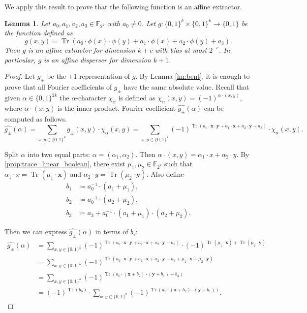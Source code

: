 \documentclass[10pt,a4paper]{article}
\newtheorem{lemma}[theorem]{Lemma}
\theoremstyle{definition}
\theoremstyle{remark}
\DeclareMathOperator{\Tr}{Tr}
\newcommand{\iso}[1]{\mathbf{#1}}
\newcommand{\Q}{{\{0,1\}}}
\newcommand{\bbF}{\mathbb{F}}
\begin{document}
We apply this result to prove that the following function is an affine extractor.
\begin{lemma}\label{lem:trace_affine_extractor}
  Let $a_0, a_1, a_2, a_3 \in \bbF_{2^k}$ with $a_0 \ne 0$. Let $g\colon \Q^k \times \Q^k \to \Q$ be the function defined as
  \[
    g(x, y) = \Tr(a_0 \cdot \phi(x) \cdot \phi(y) + a_1 \cdot \phi(x) + a_2 \cdot \phi(y) + a_3).
  \]
  Then $g$ is an affine extractor for dimension $k+c$ with bias at most $2^{-c}$.
  In particular, $g$ is an affine disperser for dimension $k+1$.
\end{lemma}
\begin{proof}
  Let $g_\pm$ be the $\pm 1$ representation of $g$. By Lemma \ref{lm:bent}, it is enough to prove that all Fourier coefficients of $g_\pm$ have the same absolute value. Recall that given $\alpha \in \Q^{2k}$ the $\alpha$-character $\chi_\alpha$ is defined as $\chi_\alpha(x, y) = {(-1)}^{\alpha \cdot (x, y)}$, where $\alpha \cdot (x, y)$ is the inner product. Fourier coefficient $\widehat{g_\pm}(\alpha)$ can be computed as follows.
  \[
    \widehat{g_\pm}(\alpha) = \sum_{x,y \in \Q^k} g_\pm(x, y) \cdot \chi_\alpha(x, y) = \sum_{x,y \in \Q^k} {(-1)}^{\Tr(a_0 \cdot \iso{x} \cdot \iso{y} + a_1 \cdot \iso{x} + a_2 \cdot \iso{y} + a_3)} \cdot \chi_\alpha(x, y).
  \]

    Split $\alpha$ into two equal parts: $\alpha = (\alpha_1, \alpha_2)$. Then $\alpha \cdot (x, y) = \alpha_1 \cdot x + \alpha_2 \cdot y$.
  By \cref{prop:trace_linear_boolean}, there exist $\mu_1, \mu_2 \in \bbF_{2^k}$ such that $\alpha_1 \cdot x = \Tr(\mu_1 \cdot \iso{x})$ and $\alpha_2 \cdot y = \Tr(\mu_2 \cdot \iso{y})$. Also define
  \begin{align*}
    b_1 &\coloneqq a_0^{-1} \cdot (a_1 + \mu_1), \\
    b_2 &\coloneqq a_0^{-1} \cdot (a_2 + \mu_2), \\
    b_3 &\coloneqq a_3 + a_0^{-1} \cdot (a_1 + \mu_1) \cdot (a_2 + \mu_2).
  \end{align*}

  Then we can express $\widehat{g_\pm}(\alpha)$ in terms of $b_i$:
  \begin{align*}
    \widehat{g_\pm}(\alpha) &=
    \sum\limits_{x,y \in \Q^k} {(-1)}^{\Tr(a_0 \cdot \iso{x} \cdot \iso{y} + a_1 \cdot \iso{x} + a_2 \cdot \iso{y} + a_3)} \cdot {(-1)}^{\Tr(\mu_1 \cdot \iso{x}) + \Tr(\mu_2 \cdot \iso{y})} \\ &=
    \sum\limits_{x,y \in \Q^k} {(-1)}^{\Tr(a_0 \cdot \iso{x} \cdot \iso{y} + a_1 \cdot \iso{x} + a_2 \cdot \iso{y} + a_3 + \mu_1 \cdot \iso{x} + \mu_2 \cdot \iso{y})} \\ &=
    \sum\limits_{x,y \in \Q^k} {(-1)}^{\Tr(a_0 \cdot (\iso{x} + b_2) \cdot (\iso{y} + b_1) + b_3)} \\ &=
    {(-1)}^{\Tr(b_3)} \cdot \sum\limits_{x,y \in \Q^k} {(-1)}^{\Tr(a_0 \cdot (\iso{x} + b_2) \cdot (\iso{y} + b_1))}.
  \end{align*}


\end{proof}
\end{document}

